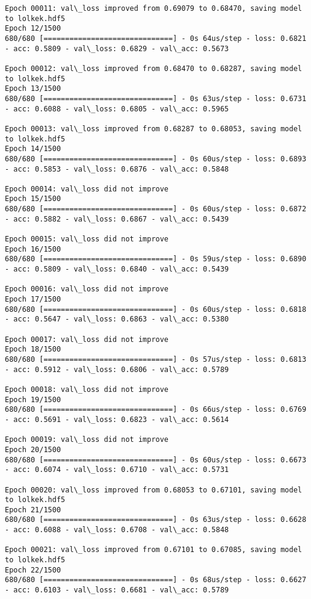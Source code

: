 \documentclass[11pt]{article}
\begin{document}
\begin{Verbatim}[commandchars=\\\{\}]
Epoch 00011: val\_loss improved from 0.69079 to 0.68470, saving model to lolkek.hdf5
Epoch 12/1500
680/680 [==============================] - 0s 64us/step - loss: 0.6821 - acc: 0.5809 - val\_loss: 0.6829 - val\_acc: 0.5673

Epoch 00012: val\_loss improved from 0.68470 to 0.68287, saving model to lolkek.hdf5
Epoch 13/1500
680/680 [==============================] - 0s 63us/step - loss: 0.6731 - acc: 0.6088 - val\_loss: 0.6805 - val\_acc: 0.5965

Epoch 00013: val\_loss improved from 0.68287 to 0.68053, saving model to lolkek.hdf5
Epoch 14/1500
680/680 [==============================] - 0s 60us/step - loss: 0.6893 - acc: 0.5853 - val\_loss: 0.6876 - val\_acc: 0.5848

Epoch 00014: val\_loss did not improve
Epoch 15/1500
680/680 [==============================] - 0s 60us/step - loss: 0.6872 - acc: 0.5882 - val\_loss: 0.6867 - val\_acc: 0.5439

Epoch 00015: val\_loss did not improve
Epoch 16/1500
680/680 [==============================] - 0s 59us/step - loss: 0.6890 - acc: 0.5809 - val\_loss: 0.6840 - val\_acc: 0.5439

Epoch 00016: val\_loss did not improve
Epoch 17/1500
680/680 [==============================] - 0s 60us/step - loss: 0.6818 - acc: 0.5647 - val\_loss: 0.6863 - val\_acc: 0.5380

Epoch 00017: val\_loss did not improve
Epoch 18/1500
680/680 [==============================] - 0s 57us/step - loss: 0.6813 - acc: 0.5912 - val\_loss: 0.6806 - val\_acc: 0.5789

Epoch 00018: val\_loss did not improve
Epoch 19/1500
680/680 [==============================] - 0s 66us/step - loss: 0.6769 - acc: 0.5691 - val\_loss: 0.6823 - val\_acc: 0.5614

Epoch 00019: val\_loss did not improve
Epoch 20/1500
680/680 [==============================] - 0s 60us/step - loss: 0.6673 - acc: 0.6074 - val\_loss: 0.6710 - val\_acc: 0.5731

Epoch 00020: val\_loss improved from 0.68053 to 0.67101, saving model to lolkek.hdf5
Epoch 21/1500
680/680 [==============================] - 0s 63us/step - loss: 0.6628 - acc: 0.6088 - val\_loss: 0.6708 - val\_acc: 0.5848

Epoch 00021: val\_loss improved from 0.67101 to 0.67085, saving model to lolkek.hdf5
Epoch 22/1500
680/680 [==============================] - 0s 68us/step - loss: 0.6627 - acc: 0.6103 - val\_loss: 0.6681 - val\_acc: 0.5789


\end{Verbatim}
\end{document}
